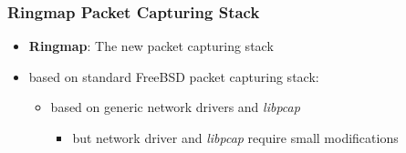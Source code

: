 \begin{frame}
\frametitle{Ringmap Packet Capturing Stack}
\begin{itemize}
	\item \textbf{Ringmap}: The new packet capturing stack
	\item based on standard FreeBSD packet capturing stack: 		
		\begin{itemize}
			\item based on generic network drivers and \emph{libpcap}
			\begin{itemize}
				\item but network driver and \emph{libpcap} require small
					modifications\newline
			\end{itemize}
		\end{itemize}
\end{itemize}
\end{frame}

